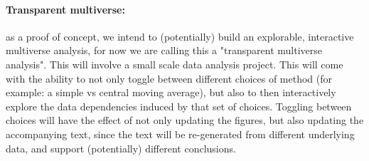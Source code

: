 \paragraph{Transparent multiverse:} as a proof of concept, we intend to (potentially) build an explorable,
interactive multiverse analysis, for now we are calling this a "transparent multiverse analysis". This will
involve a small scale data analysis project. This will come with the ability to not only toggle between different choices of
method (for example: a simple vs central moving average), but also to then interactively explore the data dependencies 
induced by that set of choices. Toggling between choices will have the effect of not only updating the figures,
but also updating the accompanying text, since the text will be re-generated from different underlying data, 
and support (potentially) different conclusions.